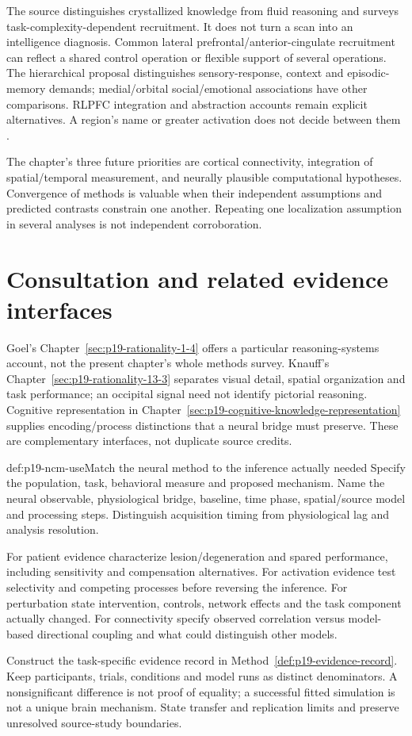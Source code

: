 The source distinguishes crystallized knowledge from fluid reasoning
and surveys task-complexity-dependent recruitment. It does not
turn a scan into an intelligence diagnosis. Common lateral
prefrontal/anterior-cingulate recruitment can reflect a shared
control operation or flexible support of several operations.
The hierarchical proposal distinguishes sensory-response, context
and episodic-memory demands; medial/orbital social/emotional
associations have other comparisons. RLPFC integration and
abstraction accounts remain explicit alternatives. A region's
name or greater activation does not decide between them
\cite[pp.~84--85]{MorrisonKnowlton2012Methods}.

The chapter's three future priorities are cortical connectivity,
integration of spatial/temporal measurement, and neurally plausible
computational hypotheses. Convergence of methods is valuable when
their independent assumptions and predicted contrasts constrain
one another. Repeating one localization assumption in several
analyses is not independent corroboration.

\section{Consultation and related evidence interfaces}
\label{sec:p19-ncm-use}

Goel's Chapter~\ref{sec:p19-rationality-1-4} offers a particular
reasoning-systems account, not the present chapter's whole methods
survey. Knauff's Chapter~\ref{sec:p19-rationality-13-3} separates
visual detail, spatial organization and task performance; an occipital
signal need not identify pictorial reasoning. Cognitive representation
in Chapter~\ref{sec:p19-cognitive-knowledge-representation} supplies
encoding/process distinctions that a neural bridge must preserve.
These are complementary interfaces, not duplicate source credits.

\begin{hbmethod}{def:p19-ncm-use}{Match the neural method to the inference actually needed}
Specify the population, task, behavioral measure and proposed mechanism.
Name the neural observable, physiological bridge, baseline, time phase,
spatial/source model and processing steps. Distinguish acquisition
timing from physiological lag and analysis resolution.

For patient evidence characterize lesion/degeneration and spared
performance, including sensitivity and compensation alternatives.
For activation evidence test selectivity and competing processes
before reversing the inference. For perturbation state intervention,
controls, network effects and the task component actually changed.
For connectivity specify observed correlation versus model-based
directional coupling and what could distinguish other models.

Construct the task-specific evidence record in
Method~\ref{def:p19-evidence-record}. Keep participants, trials,
conditions and model runs as distinct denominators. A nonsignificant
difference is not proof of equality; a successful fitted simulation
is not a unique brain mechanism. State transfer and replication
limits and preserve unresolved source-study boundaries.
\end{hbmethod}

